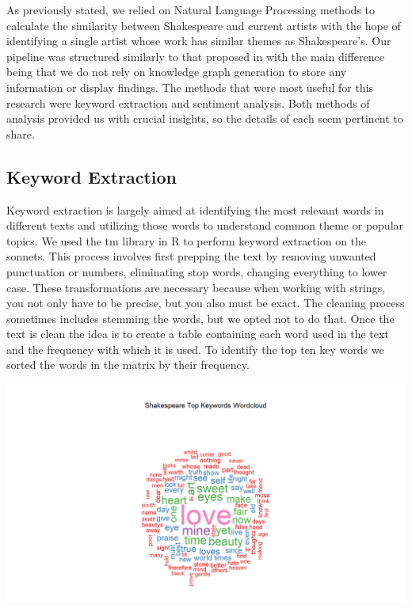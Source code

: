 \documentclass[11pt]{article}
\begin{document}
\noindent As previously stated, we relied on Natural Language Processing methods to calculate the similarity between Shakespeare and current artists with the hope of identifying a single artist whose work has similar themes as Shakespeare’s. Our pipeline was structured similarly to that proposed in \cite{NLP-for-music} with the main difference being that we do not rely on knowledge graph generation to store any information or display findings. The methods that were most useful for this research were keyword extraction and sentiment analysis. Both methods of analysis provided us with crucial insights, so the details of each seem pertinent to share. 

\subsection{Keyword Extraction}
Keyword extraction is largely aimed at identifying the most relevant words in different texts and utilizing those words to understand common theme or popular topics.\cite{monkey} We used the tm library in R to perform keyword extraction\cite{tm} on the sonnets. This process involves first prepping the text by removing unwanted punctuation or numbers, eliminating stop words, changing everything to lower case. These transformations are necessary because when working with strings, you not only have to be precise, but you also must be exact. The cleaning process sometimes includes stemming the words, but we opted not to do that. Once the text is clean the idea is to create a table containing each word used in the text and the frequency with which it is used. To identify the top ten key words we sorted the words in the matrix by their frequency. 

\begin{center}
\includegraphics[width=14cm]{_assets/Shakespeare_Keywords_WordCloud.png}
\end{center}
\end{document}
